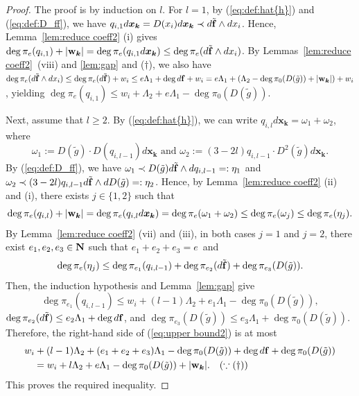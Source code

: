 \documentclass{amsart}
\theoremstyle{plain}
\theoremstyle{definition}
\newcommand{\N}{{\bf N}}
\newcommand{\x}{{\boldsymbol x}}
\newcommand{\w}{{\bf w}}
\newcommand{\bk}{{\boldsymbol k}}
\newcommand{\ff}{{\bf f}}
\newcommand{\degw  }{\deg}
\begin{document}
\begin{proof}
The proof is by induction on $l$. 
For $l=1$, 
by (\ref{eq:def:hat{h}}) and (\ref{eq:def:D_ff}), 
we have 
$q_{i,1}d\x _{\bk }=D(x_i)d\x _{\bk }\prec d\tilde{\ff }\wedge dx_i$. 
Hence, 
Lemma~\ref{lem:reduce coeff2} (i) gives 
$\deg \pi _e(q_{i,1})+|\w _{\bk }|
=\deg \pi _e(q_{i,1}d\x _{\bk })
\le \deg \pi _e(d\tilde{\ff }\wedge dx_i)$. 
By Lemmas~\ref{lem:reduce coeff2}~(viii) and \ref{lem:gap} 
and ($\dag $), 
we also have 
$\deg \pi _e(d\tilde{\ff }\wedge dx_i)
\le \deg \pi _{e}(d\tilde{\ff })+w_i
\le e\Lambda _1+\degw d\ff +w_i 
=e\Lambda _1+(\Lambda _2-\degw \pi _0(D(\tilde{g}))+|\w _{\bk }|)+w_i$, 
yielding 
$\deg \pi _e(q_{i,1})\le 
w_i+\Lambda _2+e\Lambda _1-\degw \pi _0(D(\tilde{g}))$. 


Next, assume that $l\ge 2$. 
By (\ref{eq:def:hat{h}}),  
we can write $q_{i,l}d\x _{\bk }=\omega _1+\omega _2$, 
where 
$$
\omega _1:=D(\tilde{g})\cdot D(q_{i,l-1})d\x _{\bk }
\text{ \ and \ }
\omega _2:=(3-2l)q_{i,l-1}\cdot D^2(\tilde{g})d\x _{\bk }. 
$$
By (\ref{eq:def:D_ff}), 
we have 
$\omega _1\prec D(\tilde{g})d\tilde{\ff }\wedge dq_{i,l-1}=:\eta _1$ 
and 
$\omega _2\prec (3-2l)q_{i,l-1}d\tilde{\ff }\wedge dD(\tilde{g})=:\eta _2$. 
Hence, by Lemma~\ref{lem:reduce coeff2} (ii) and (i), 
there exists $j\in \{ 1,2\} $ such that 
$$
\degw \pi _e(q_{i,l})+|\w _{\bk }|
=\degw \pi _e(q_{i,l}d\x _{\bk })
=\degw \pi _e(\omega _1+\omega _2)
\le \deg \pi _e(\omega _j)\le \deg \pi _e(\eta _j). 
$$ 
By Lemma~\ref{lem:reduce coeff2} (vii) and (iii), 
in both cases $j=1$ and $j=2$, 
there exist $e_1,e_2,e_3\in \N $ such that $e_1+e_2+e_3=e$~and 
\begin{equation}\label{eq:upper bound2}
\deg \pi _e(\eta _j) \le 
\deg \pi _{e_1}(q_{i,l-1})
+\deg \pi _{e_2}(d\tilde{\ff })
+\deg \pi _{e_3}(D(\tilde{g})). 
\end{equation}
Then, 
the induction hypothesis and Lemma~\ref{lem:gap} give 
$$
\deg \pi _{e_1}(q_{i,l-1})
\le w_i+(l-1)\Lambda _2+e_1\Lambda _1-\degw \pi _0(D(\tilde{g})), 
$$
$\degw \pi _{e_2}(d\tilde{\ff })\le e_2\Lambda _1+\degw d\ff$, 
and 
$\degw \pi _{e_3}(D(\tilde{g}))\le e_3\Lambda _1+\degw \pi _0(D(\tilde{g}))$. 
Therefore, 
the right-hand side of (\ref{eq:upper bound2}) is at most 
\begin{align*}
&w_i+(l-1)\Lambda _2 +(e_1+e_2+e_3)\Lambda _1-\degw \pi _0(D(\tilde{g})) 
+\degw d\ff +\degw \pi _0(D(\tilde{g})) \\
&\quad =w_i+l\Lambda _2+e\Lambda _1-\degw \pi _0(D(\tilde{g}))+|\w _{\bk }|. 
\quad (\because (\dag))
\end{align*}
This proves the required inequality. 
\end{proof}
\end{document}
